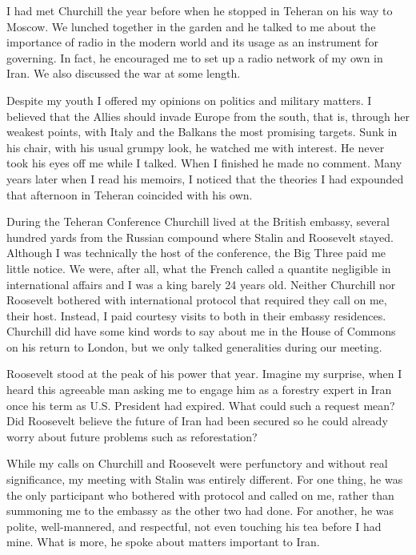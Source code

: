 I had met Churchill the year before when he stopped in Teheran on his way to Moscow. We lunched together in the garden and he talked to me about the importance of radio in the modern world and its usage as an instrument for governing. In fact, he encouraged me to set up a radio network of my own in Iran. We also discussed the war at some length. 

Despite my youth I offered my opinions on politics and military matters. I believed that the Allies should invade Europe from the south, that is, through her weakest points, with Italy and the Balkans the most promising targets. Sunk in his chair, with his usual grumpy look, he watched me with interest. He never took his eyes off me while I talked. When I finished he made no comment. Many years later when I read his memoirs, I noticed that the theories I had expounded that afternoon in Teheran coincided with his own. 

During the Teheran Conference Churchill lived at the British embassy, several hundred yards from the Russian compound where Stalin and Roosevelt stayed. Although I was technically the host of the conference, the Big Three paid me little notice. We were, after all, what the French called a quantite negligible in international affairs and I was a king barely 24 years old. Neither Churchill nor Roosevelt bothered with international protocol that required they call on me, their host. Instead, I paid courtesy visits to both in their embassy residences. Churchill did have some kind words to say about me in the House of Commons on his return to London, but we only talked generalities during our meeting. 

Roosevelt stood at the peak of his power that year. Imagine my surprise, when I heard this agreeable man asking me to engage him as a forestry expert in Iran once his term as U.S. President had expired. What could such a request mean? Did Roosevelt believe the future of Iran had been secured so he could already worry about future problems such as reforestation? 

While my calls on Churchill and Roosevelt were perfunctory and without real significance, my meeting with Stalin was entirely different. For one thing, he was the only participant who bothered with protocol and called on me, rather than summoning me to the embassy as the other two had done. For another, he was polite, well-mannered, and respectful, not even touching his tea before I had mine. What is more, he spoke about matters important to Iran. 

